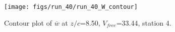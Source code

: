 \begin{figure}[H]
\centering
\texttt{[image: figs/run\_40/run\_40\_W\_contour]}
\caption{Contour plot of $\overline{w}$ at $z/c$=8.50, $V_{free}$=33.44, station 4.}
\label{fig:run_40_W_contour}
\end{figure}


